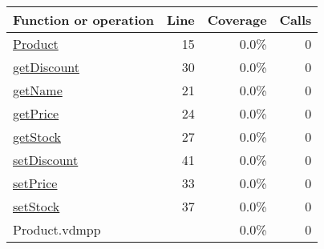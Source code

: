 \begin{longtable}{|l|r|r|r|}
\hline
Function or operation & Line & Coverage & Calls \\
\hline
\hline
\hyperref[Product:15]{Product} & 15&0.0\% & 0 \\
\hline
\hyperref[getDiscount:30]{getDiscount} & 30&0.0\% & 0 \\
\hline
\hyperref[getName:21]{getName} & 21&0.0\% & 0 \\
\hline
\hyperref[getPrice:24]{getPrice} & 24&0.0\% & 0 \\
\hline
\hyperref[getStock:27]{getStock} & 27&0.0\% & 0 \\
\hline
\hyperref[setDiscount:41]{setDiscount} & 41&0.0\% & 0 \\
\hline
\hyperref[setPrice:33]{setPrice} & 33&0.0\% & 0 \\
\hline
\hyperref[setStock:37]{setStock} & 37&0.0\% & 0 \\
\hline
\hline
Product.vdmpp & & 0.0\% & 0 \\
\hline
\end{longtable}

